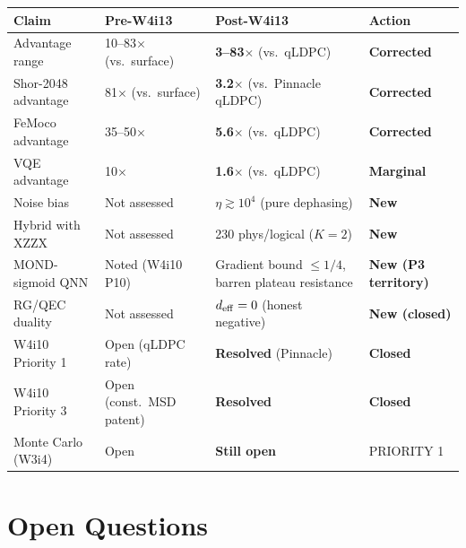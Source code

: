 \documentclass[11pt]{article}
\theoremstyle{definition}
\theoremstyle{remark}
\begin{document}
\begin{center}
\begin{tabular}{@{}llll@{}}
\toprule
Claim & Pre-W4i13 & Post-W4i13 & Action \\
\midrule
Advantage range & 10--83$\times$ (vs.\ surface) & \textbf{3--83$\times$}
  (vs.\ qLDPC) & \textbf{Corrected} \\
Shor-2048 advantage & 81$\times$ (vs.\ surface) & \textbf{3.2$\times$}
  (vs.\ Pinnacle qLDPC) & \textbf{Corrected} \\
FeMoco advantage & 35--50$\times$ & \textbf{5.6$\times$} (vs.\ qLDPC)
  & \textbf{Corrected} \\
VQE advantage & 10$\times$ & \textbf{1.6$\times$} (vs.\ qLDPC)
  & \textbf{Marginal} \\
Noise bias & Not assessed & $\eta \gtrsim 10^4$ (pure dephasing)
  & \textbf{New} \\
Hybrid with XZZX & Not assessed & 230 phys/logical ($K=2$)
  & \textbf{New} \\
MOND-sigmoid QNN & Noted (W4i10 P10) & Gradient bound $\leq 1/4$,
  barren plateau resistance & \textbf{New (P3 territory)} \\
RG/QEC duality & Not assessed & $d_{\rm eff} = 0$ (honest negative)
  & \textbf{New (closed)} \\
W4i10 Priority 1 & Open (qLDPC rate) & \textbf{Resolved} (Pinnacle)
  & \textbf{Closed} \\
W4i10 Priority 3 & Open (const.\ MSD patent) & \textbf{Resolved}
  & \textbf{Closed} \\
Monte Carlo (W3i4) & Open & \textbf{Still open} & PRIORITY 1 \\
\bottomrule
\end{tabular}
\end{center}

\section{Open Questions}
\label{sec:open-questions}
\end{document}
